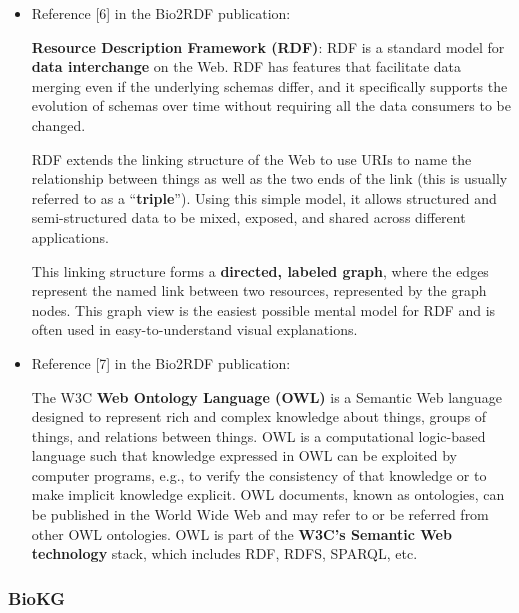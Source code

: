 \documentclass{article}
\begin{document}
\begin{itemize}
\item Reference [6] in the Bio2RDF publication:
\begin{displayquote}
\textbf{Resource Description Framework (RDF)}: RDF is a standard model for \textbf{data interchange} on the Web. RDF has features that facilitate data merging even if the underlying schemas differ, and it specifically supports the evolution of schemas over time without requiring all the data consumers to be changed.

RDF extends the linking structure of the Web to use URIs to name the relationship between things as well as the two ends of the link (this is usually referred to as a “\textbf{triple}”). Using this simple model, it allows structured and semi-structured data to be mixed, exposed, and shared across different applications.

This linking structure forms a \textbf{directed, labeled graph}, where the edges represent the named link between two resources, represented by the graph nodes. This graph view is the easiest possible mental model for RDF and is often used in easy-to-understand visual explanations. 
\end{displayquote}


\item Reference [7] in the Bio2RDF publication:
\begin{displayquote}
The W3C \textbf{Web Ontology Language (OWL)} is a Semantic Web language designed to represent rich and complex knowledge about things, groups of things, and relations between things. OWL is a computational logic-based language such that knowledge expressed in OWL can be exploited by computer programs, e.g., to verify the consistency of that knowledge or to make implicit knowledge explicit. OWL documents, known as ontologies, can be published in the World Wide Web and may refer to or be referred from other OWL ontologies. OWL is part of the \textbf{W3C’s Semantic Web technology} stack, which includes RDF, RDFS, SPARQL, etc. 
\end{displayquote}

\end{itemize}


\subsubsection{BioKG}
\end{document}
